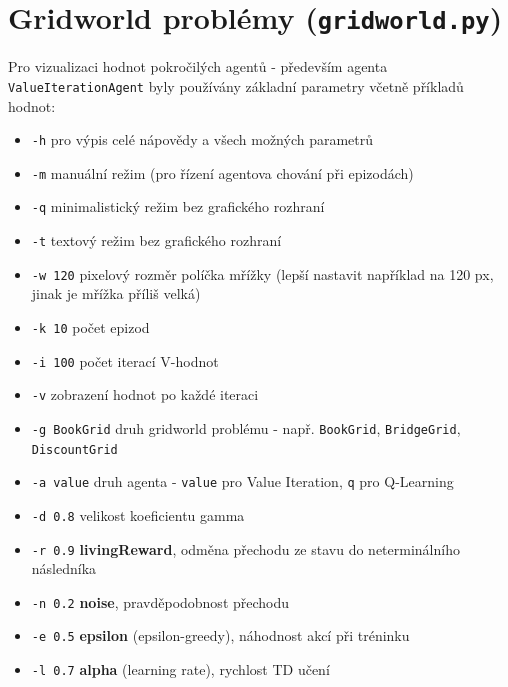 \section{Gridworld problémy (\texttt{gridworld.py})}
\label{priloha:manualg}
Pro vizualizaci hodnot pokročilých agentů - především agenta \texttt{ValueIterationAgent} byly používány základní parametry včetně příkladů hodnot:
\begin{itemize}
\item \texttt{-h} pro výpis celé nápovědy a všech možných parametrů
\item \texttt{-m} manuální režim (pro řízení agentova chování při epizodách)
\item \texttt{-q} minimalistický režim bez grafického rozhraní
\item \texttt{-t} textový režim bez grafického rozhraní
\item \texttt{-w 120} pixelový rozměr políčka mřížky (lepší nastavit například na 120 px, jinak je mřížka příliš velká)
\item \texttt{-k 10} počet epizod
\item \texttt{-i 100} počet iterací V-hodnot
\item \texttt{-v} zobrazení hodnot po každé iteraci
\item \texttt{-g BookGrid} druh gridworld problému - např. \texttt{BookGrid}, \texttt{BridgeGrid}, \texttt{DiscountGrid}
\item \texttt{-a value} druh agenta - \texttt{value} pro Value Iteration, \texttt{q} pro Q-Learning
\item \texttt{-d 0.8} velikost koeficientu gamma
\item \texttt{-r 0.9} \textbf{livingReward}, odměna přechodu ze stavu do neterminálního následníka
\item \texttt{-n 0.2} \textbf{noise}, pravděpodobnost přechodu 
\item \texttt{-e 0.5} \textbf{epsilon} (epsilon-greedy), náhodnost akcí při tréninku
\item \texttt{-l 0.7} \textbf{alpha} (learning rate), rychlost TD učení
\end{itemize}
